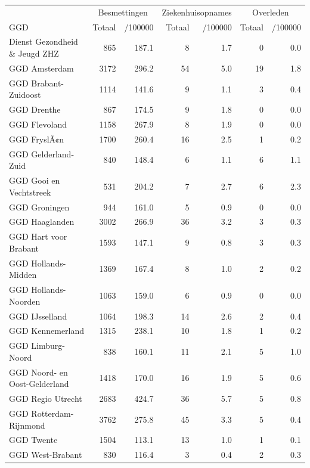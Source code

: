 \documentclass[
  english,
  man,floatsintext]{apa6}
\begin{document}
\begin{table}
\centering\begingroup\fontsize{10}{12}\selectfont

\begin{threeparttable}
\begin{tabular}{lrrrrrr}
\toprule
\multicolumn{1}{c}{ } & \multicolumn{2}{c}{Besmettingen} & \multicolumn{2}{c}{Ziekenhuisopnames} & \multicolumn{2}{c}{Overleden} \\
\cmidrule(l{3pt}r{3pt}){2-3} \cmidrule(l{3pt}r{3pt}){4-5} \cmidrule(l{3pt}r{3pt}){6-7}
GGD & Totaal & /100000 & Totaal & /100000 & Totaal & /100000\\
\midrule
Dienst Gezondheid \& Jeugd ZHZ & 865 & 187.1 & 8 & 1.7 & 0 & 0.0\\
GGD Amsterdam & 3172 & 296.2 & 54 & 5.0 & 19 & 1.8\\
GGD Brabant-Zuidoost & 1114 & 141.6 & 9 & 1.1 & 3 & 0.4\\
GGD Drenthe & 867 & 174.5 & 9 & 1.8 & 0 & 0.0\\
GGD Flevoland & 1158 & 267.9 & 8 & 1.9 & 0 & 0.0\\
GGD FryslÃ¢n & 1700 & 260.4 & 16 & 2.5 & 1 & 0.2\\
GGD Gelderland-Zuid & 840 & 148.4 & 6 & 1.1 & 6 & 1.1\\
GGD Gooi en Vechtstreek & 531 & 204.2 & 7 & 2.7 & 6 & 2.3\\
GGD Groningen & 944 & 161.0 & 5 & 0.9 & 0 & 0.0\\
GGD Haaglanden & 3002 & 266.9 & 36 & 3.2 & 3 & 0.3\\
GGD Hart voor Brabant & 1593 & 147.1 & 9 & 0.8 & 3 & 0.3\\
GGD Hollands-Midden & 1369 & 167.4 & 8 & 1.0 & 2 & 0.2\\
GGD Hollands-Noorden & 1063 & 159.0 & 6 & 0.9 & 0 & 0.0\\
GGD IJsselland & 1064 & 198.3 & 14 & 2.6 & 2 & 0.4\\
GGD Kennemerland & 1315 & 238.1 & 10 & 1.8 & 1 & 0.2\\
GGD Limburg-Noord & 838 & 160.1 & 11 & 2.1 & 5 & 1.0\\
GGD Noord- en Oost-Gelderland & 1418 & 170.0 & 16 & 1.9 & 5 & 0.6\\
GGD Regio Utrecht & 2683 & 424.7 & 36 & 5.7 & 5 & 0.8\\
GGD Rotterdam-Rijnmond & 3762 & 275.8 & 45 & 3.3 & 5 & 0.4\\
GGD Twente & 1504 & 113.1 & 13 & 1.0 & 1 & 0.1\\
GGD West-Brabant & 830 & 116.4 & 3 & 0.4 & 2 & 0.3\\

\end{tabular}
\end{threeparttable}
\end{table}
\end{document}
